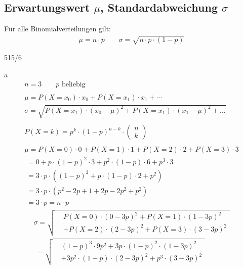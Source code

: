 \subsection{Erwartungswert \texorpdfstring{$\mu$}{My}, Standardabweichung \texorpdfstring{$\sigma$}{Sigma}}
Für alle Binomialverteilungen gilt:
\begin{gather*}
  \mu = n \cdot p \qquad \sigma = \sqrt{n \cdot p \cdot (1 - p)}
\end{gather*}
\begin{exercise}{515/6}
  \item [a]
  \begin{gather*}
    n = 3 \qquad p \text{ beliebig} \\\\
    \mu = P(X = x_0) \cdot x_0 + P(X = x_1) \cdot x_1 + \cdots \\
    \sigma = \sqrt{P(X = x_1) \cdot (x_0 - \mu)^2 + P(X = x_1) \cdot (x_1 - \mu)^2 + \dots} \\\\
    P(X = k) = p^k \cdot (1 - p)^{n - k} \cdot \begin{pmatrix}n \\ k\end{pmatrix} \\\\
    \mu = P(X = 0) \cdot 0 + P(X = 1) \cdot 1 + P(X = 2) \cdot 2 + P(X = 3) \cdot 3 \\
    \;= 0 + p \cdot (1 - p)^2 \cdot 3 + p^2 \cdot (1 - p) \cdot 6 + p^3 \cdot 3 \\
    \;= 3 \cdot p \cdot ((1 - p)^2 + p \cdot (1 - p) \cdot 2 + p^2) \\
    \;= 3 \cdot p \cdot (p^2 - 2p + 1 + 2p - 2p^2 + p^2) \\
    \;= 3 \cdot p = n \cdot p
  \end{gather*}
  \begin{gather*}
    \sigma = \sqrt{
      \begin{aligned}
        &P(X = 0) \cdot (0 - 3p)^2 + P(X = 1) \cdot (1 - 3p)^2 \\
        &+ P(X = 2) \cdot (2 - 3p)^2 + P(X = 3) \cdot (3 - 3p)^2
      \end{aligned}
    } \\
    \;= \sqrt{
      \begin{aligned}
        &(1 - p)^3 \cdot 9p^2 + 3p \cdot (1 - p)^2 \cdot (1 - 3p)^2 \\
        &+ 3p^2 \cdot (1 - p) \cdot (2 - 3p)^2 + p^3 \cdot (3 - 3p)^2
      \end{aligned}
}
\end{gather*}
\end{exercise}
